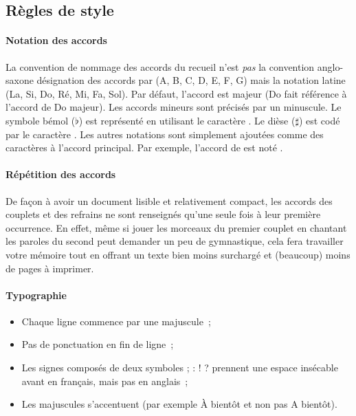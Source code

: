 \subsection{Règles de style}

\paragraph{Notation des accords}
La convention de nommage des accords du recueil n'est \emph{pas} la
convention anglo-saxone désignation des accords par (A, B, C, D, E, F,
G) mais la notation latine (La, Si, Do, Ré, Mi, Fa, Sol). Par défaut,
l'accord est majeur (Do fait référence à l'accord de Do majeur). Les
accords mineurs sont précisés par un  minuscule.  Le
symbole bémol ($\flat$) est représenté en utilisant le caractère
\command{\&}. Le dièse ($\sharp$) est codé par le caractère
\command{\#}. Les autres notations sont simplement ajoutées comme des
caractères à l'accord principal. Par exemple, l'accord de  est noté \latexcom{[La\&m]}.

\paragraph{Répétition des accords}
De façon à avoir un document lisible et relativement compact, les
accords des couplets et des refrains ne sont renseignés qu'une seule
fois à leur première occurrence. En effet, même si jouer les morceaux
du premier couplet en chantant les paroles du second peut demander un
peu de gymnastique, cela fera travailler votre mémoire tout en offrant
un texte bien moins surchargé et (beaucoup) moins de pages à imprimer.

\paragraph{Typographie}
\begin{itemize}
  \item Chaque ligne commence par une majuscule~;
  \item Pas de ponctuation en fin de ligne~;
  \item Les signes composés de deux symboles {\og}; : ! ?{\fg}
    prennent une espace insécable avant en français, mais pas en
    anglais~;
  \item Les majuscules s'accentuent (par exemple {\og}À bientôt{\fg}
    et non pas {\og}A bientôt{\fg}).
\end{itemize}


